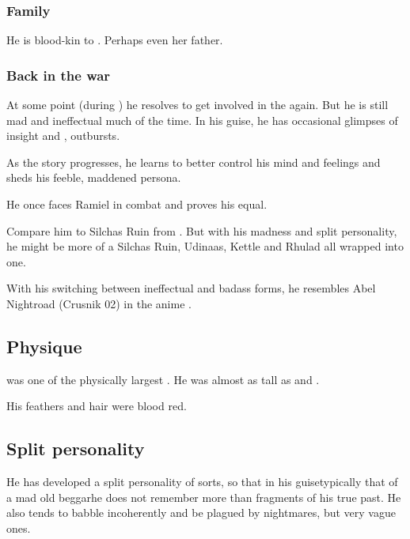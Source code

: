 \subsubsection{Family}
He is blood-kin to . 
Perhaps even her father. 





\subsubsection{Back in the war}
At some point (during \SentinelsofMithEmph) he resolves to get involved in the \secretwar{} again. 
But he is still mad and ineffectual much of the time. 
In his \human{} guise, he has occasional glimpses of insight and ,  outbursts.

As the story progresses, he learns to better control his mind and feelings and sheds his feeble, maddened persona.

He once faces Ramiel in combat and proves his equal.

Compare him to Silchas Ruin from \cite{StevenEriksonIanCameronEsslemont:MalazanBookoftheFallen}. 
But with his madness and split personality, he might be more of a Silchas Ruin, Udinaas, Kettle and Rhulad all wrapped into one.

With his switching between ineffectual and badass forms, he resembles Abel Nightroad (Crusnik 02) in the anime \cite{Anime:TrinityBlood}.









\subsection{Physique}
\Sithiyacaan{} was one of the physically largest \satharioth. 
He was almost as tall as \Harbeth{} and \Zachirah. 

His feathers and hair were blood red.









\subsection{Split personality}
He has developed a split personality of sorts, so that in his guise\dash typically that of a mad old beggar\dash he does not remember more than fragments of his true past. He also tends to babble incoherently and be plagued by nightmares, but very vague ones. 

